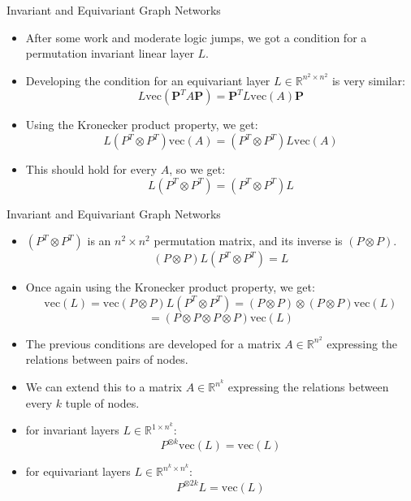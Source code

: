 \documentclass{beamer}
\begin{document}
\begin{frame}{Invariant and Equivariant Graph Networks}
    \begin{itemize}
        \setlength{\itemsep}{\fill}
        \item After some work and moderate logic jumps, we got a condition for a permutation invariant linear layer $L$.
        \item Developing the condition for an equivariant layer $L \in \mathbb{R}^{n^2 \times n^2}$ is very similar:
        \[ L\text{vec}(\boldsymbol{P}^T A\boldsymbol{P}) =\boldsymbol{P}^T L\text{vec}(A) \boldsymbol{P}\]
        \item Using the Kronecker product property, we get:
        \[ L(P^T\otimes P^T)\text{vec}(A) = (P^T\otimes P^T)L\text{vec}(A) \]
        \item This should hold for every $A$, so we get:
        \[ L(P^T\otimes P^T) = (P^T\otimes P^T)L \]
    \end{itemize}
\end{frame}
\begin{frame}{Invariant and Equivariant Graph Networks}
    \begin{itemize}
        \setlength{\itemsep}{\fill}
        \item $(P^T\otimes P^T)$ is an $n^2 \times n^2$ permutation matrix, and its inverse is $(P\otimes P)$.
        \[ (P\otimes P)L(P^T\otimes P^T) = L \]
        \item Once again using the Kronecker product property, we get:
        \[ \text{vec}(L) = \text{vec}(P\otimes P)L(P^T\otimes P^T) = (P\otimes P) \otimes (P \otimes P) \text{vec}(L) \]
        \[ = (P \otimes P \otimes P \otimes P) \text{vec}(L) \]
        \item The previous conditions are developed for a matrix $A \in \mathbb{R}^{n^2}$ expressing the relations between pairs of nodes.
        \item We can extend this to a matrix $A \in \mathbb{R}^{n^k}$ expressing the relations between every $k$ tuple of nodes.
        \item for invariant layers $L \in \mathbb{R}^{1 \times n^k}$:
        \[ P^{\otimes k}\text{vec}(L) = \text{vec}(L) \]
        \item for equivariant layers $L \in \mathbb{R}^{n^k \times n^k}$:
        \[ P^{\otimes 2k}L = \text{vec}(L) \]
    \end{itemize}
\end{frame}
\end{document}

